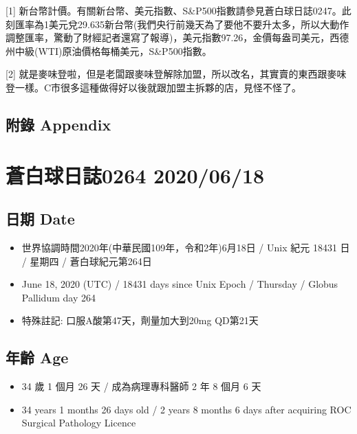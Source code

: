 \documentclass[a5paper, 11pt
]{book}
\providecommand{\tightlist}{%
  \setlength{\itemsep}{0pt}\setlength{\parskip}{0pt}}
\begin{document}
{[}1{]}
新台幣計價。有關新台幣、美元指數、S\&P500指數請參見蒼白球日誌0247。此刻匯率為1美元兌29.635新台幣(我們央行前幾天為了要他不要升太多，所以大動作調整匯率，驚動了財經記者還寫了報導)，美元指數97.26，金價每盎司美元，西德州中級(WTI)原油價格每桶美元，S\&P500指數。

{[}2{]}
就是麥味登啦，但是老闆跟麥味登解除加盟，所以改名，其實賣的東西跟麥味登一樣。C市很多這種做得好以後就跟加盟主拆夥的店，見怪不怪了。

\hypertarget{ux9644ux9304-appendix-14}{%
\subsection{附錄 Appendix}\label{ux9644ux9304-appendix-14}}

\hypertarget{ux84bcux767dux7403ux65e5ux8a8c0264-20200618}{%
\section{蒼白球日誌0264
2020/06/18}\label{ux84bcux767dux7403ux65e5ux8a8c0264-20200618}}

\hypertarget{ux65e5ux671f-date-15}{%
\subsection{日期 Date}\label{ux65e5ux671f-date-15}}

\begin{itemize}
\tightlist
\item
  世界協調時間2020年(中華民國109年，令和2年)6月18日 / Unix 紀元 18431 日
  / 星期四 / 蒼白球紀元第264日
\item
  June 18, 2020 (UTC) / 18431 days since Unix Epoch / Thursday / Globus
  Pallidum day 264
\item
  特殊註記: 口服A酸第47天，劑量加大到20mg QD第21天
\end{itemize}

\hypertarget{ux5e74ux9f61-age-15}{%
\subsection{年齡 Age}\label{ux5e74ux9f61-age-15}}

\begin{itemize}
\tightlist
\item
  34 歲 1 個月 26 天 / 成為病理專科醫師 2 年 8 個月 6 天
\item
  34 years 1 months 26 days old / 2 years 8 months 6 days after
  acquiring ROC Surgical Pathology Licence
\end{itemize}
\end{document}
